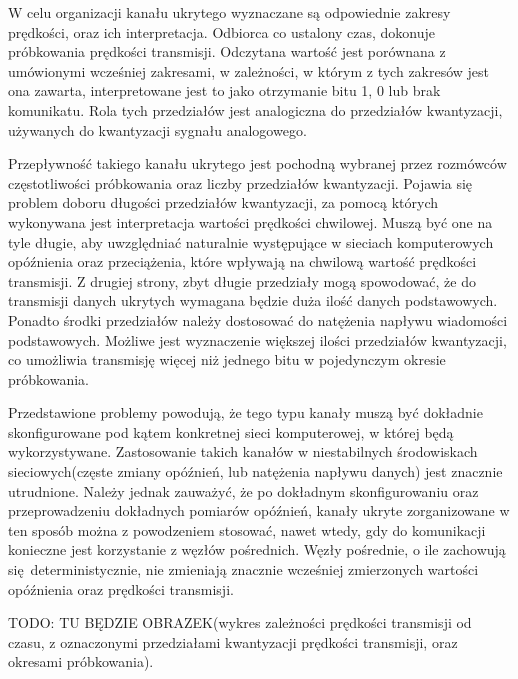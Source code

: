 \documentclass[a4paper, twoside, 12pt]{report}
\begin{document}
        W celu organizacji kanału ukrytego wyznaczane są odpowiednie zakresy prędkości, oraz ich
        interpretacja. Odbiorca co ustalony czas, dokonuje próbkowania prędkości
        transmisji. Odczytana wartość jest porównana z umówionymi wcześniej zakresami,
        w zależności, w którym z tych zakresów jest ona zawarta, interpretowane jest to
        jako otrzymanie bitu 1, 0 lub brak komunikatu. Rola tych przedziałów jest analogiczna
        do przedziałów kwantyzacji, używanych do kwantyzacji sygnału analogowego.

        Przepływność takiego kanału ukrytego jest pochodną wybranej przez rozmówców
        częstotliwości próbkowania oraz liczby przedziałów kwantyzacji. Pojawia się
        problem doboru długości przedziałów kwantyzacji, za pomocą których wykonywana
        jest interpretacja wartości
        prędkości chwilowej. Muszą być one na tyle długie, aby uwzględniać naturalnie
        występujące w sieciach komputerowych opóźnienia oraz przeciążenia, które wpływają
        na chwilową wartość prędkości transmisji. Z drugiej strony, zbyt długie przedziały
        mogą spowodować, że do transmisji danych ukrytych wymagana będzie duża ilość danych
        podstawowych. Ponadto środki przedziałów należy dostosować do natężenia
        napływu wiadomości podstawowych. Możliwe jest wyznaczenie większej ilości
        przedziałów kwantyzacji, co umożliwia transmisję więcej niż jednego bitu w pojedynczym
        okresie próbkowania.

        Przedstawione problemy powodują, że tego typu kanały muszą być dokładnie
        skonfigurowane pod kątem konkretnej sieci komputerowej, w której będą wykorzystywane.
        Zastosowanie takich kanałów w niestabilnych środowiskach sieciowych(częste zmiany
        opóźnień, lub natężenia napływu danych) jest znacznie utrudnione. Należy jednak
        zauważyć, że po dokładnym skonfigurowaniu oraz przeprowadzeniu dokładnych
        pomiarów opóźnień, kanały ukryte zorganizowane w ten sposób można z powodzeniem
        stosować, nawet wtedy, gdy do komunikacji konieczne jest korzystanie z węzłów pośrednich.
        Węzły pośrednie, o ile zachowują się deterministycznie, nie zmieniają znacznie wcześniej
        zmierzonych wartości opóźnienia oraz prędkości transmisji.

        TODO: TU BĘDZIE OBRAZEK(wykres zależności prędkości transmisji od czasu, z
        oznaczonymi przedziałami kwantyzacji prędkości transmisji, oraz okresami
        próbkowania).
\end{document}
